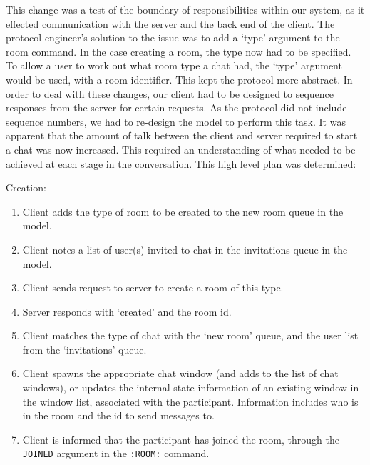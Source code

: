 This change was a test of the boundary of responsibilities within our system, as it effected communication with the server and the back end of the client. The protocol engineer's solution to the issue was to add a `type' argument to the room command. In the case creating a room, the type now had to be specified. To allow a user to work out what room type a chat had, the `type' argument would be used, with a room identifier. This kept the protocol more abstract. In order to deal with these changes, our client had to be designed to sequence responses from the server for certain requests. As the protocol did not include sequence numbers, we had to re-design the model to perform this task. It was apparent that the amount of talk between the client and server required to start a chat was now increased. This required an understanding of what needed to be achieved at each stage in the conversation. This high level plan was determined:

Creation:
\begin{enumerate}
\item Client adds the type of room to be created to the new room queue in the model.
\item Client notes a list of user(s) invited to chat in the invitations queue in the model.
\item Client sends request to server to create a room of this type.
\item Server responds with `created' and the room id.
\item Client matches the type of chat with the `new room' queue, and the user list from the `invitations' queue.
\item Client spawns the appropriate chat window (and adds to the list of chat windows), or updates the internal state information of an existing window in the window list, associated with the participant. Information includes who is in the room and the id to send messages to.
\item Client is informed that the participant has joined the room, through the \texttt{JOINED} argument in the \texttt{:ROOM:} command.
\end {enumerate}

